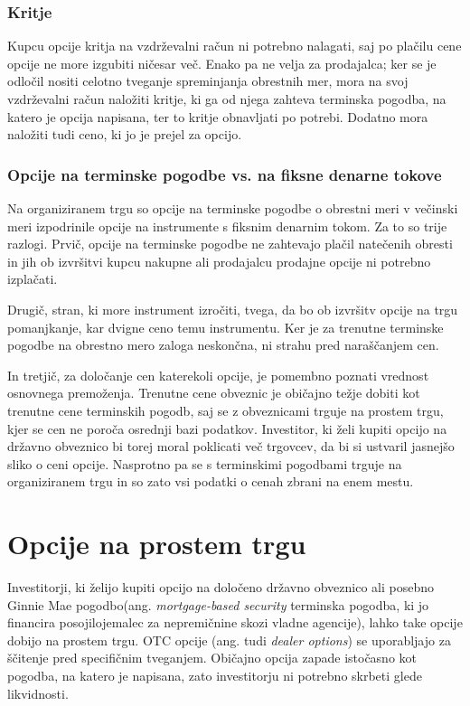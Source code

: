 \documentclass[a4paper]{article}
\begin{document}
\subsubsection{Kritje}
Kupcu opcije kritja na vzdrževalni račun ni potrebno nalagati, saj po plačilu cene opcije ne more izgubiti ničesar več. Enako 
pa ne velja za prodajalca; ker se je odločil nositi celotno tveganje spreminjanja obrestnih mer, mora na svoj vzdrževalni račun
naložiti kritje, ki ga od njega zahteva terminska pogodba, na katero je opcija napisana, ter to kritje obnavljati po potrebi.
Dodatno mora naložiti tudi ceno, ki jo je prejel za opcijo.

\subsubsection{Opcije na terminske pogodbe vs. na fiksne denarne tokove}
Na organiziranem trgu so opcije na terminske pogodbe o obrestni meri v večinski meri izpodrinile opcije na instrumente s fiksnim
denarnim tokom. Za to so trije razlogi. Prvič, opcije na terminske pogodbe ne zahtevajo plačil natečenih obresti in jih ob izvršitvi kupcu
nakupne ali prodajalcu prodajne opcije ni potrebno izplačati.

Drugič, stran, ki more instrument izročiti, tvega, da bo ob izvršitv
opcije na trgu pomanjkanje, kar dvigne ceno temu instrumentu. Ker je za trenutne terminske pogodbe na obrestno mero zaloga neskončna,
ni strahu pred naraščanjem cen. 

In tretjič, za določanje cen katerekoli opcije, je pomembno poznati vrednost osnovnega premoženja.
Trenutne cene obveznic je običajno težje dobiti kot trenutne cene terminskih pogodb, saj se z obveznicami trguje na prostem trgu, kjer
se cen ne poroča osrednji bazi podatkov. Investitor, ki želi kupiti opcijo na državno obveznico bi torej moral poklicati več trgovcev, 
da bi si ustvaril jasnejšo sliko o ceni opcije. Nasprotno pa se s terminskimi pogodbami trguje na organiziranem trgu in so zato vsi 
podatki o cenah zbrani na enem mestu. 

\section{Opcije na prostem trgu}
Investitorji, ki želijo kupiti opcijo na določeno državno obveznico ali posebno Ginnie Mae pogodbo(ang. \textit{mortgage-based security}
terminska pogodba, ki jo financira posojilojemalec za nepremičnine skozi vladne agencije), lahko take opcije dobijo na prostem trgu.
OTC opcije (ang. tudi \textit{dealer options}) se uporabljajo za ščitenje pred specifičnim tveganjem. Običajno opcija zapade istočasno
kot pogodba, na katero je napisana, zato investitorju ni potrebno skrbeti glede likvidnosti.
\end{document}
